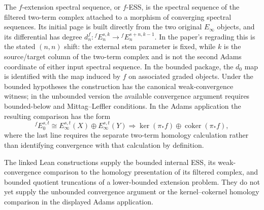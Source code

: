 \begin{definition}
  \label{def:f-extension-ss}
  \notready
  The $f$-extension spectral sequence, or $f$-ESS, is the spectral sequence of
  the filtered two-term complex attached to a morphism of converging spectral
  sequences.  Its initial page is built directly from the two original
  $E_\infty$ objects, and its differential has degree
  $d_n^f:{}^fE_n^{s,k}\to{}^fE_n^{s+n,k-1}$.  In the paper's regrading this is
  the stated $(n,n)$ shift: the external stem parameter is fixed, while $k$
  is the source/target column of the two-term complex and is not the second
  Adams coordinate of either input spectral sequence.  In the bounded
  package, the $d_0$ map is identified with the map induced by $f$ on
  associated graded objects.  Under the bounded hypotheses the construction has the
  canonical weak-convergence witness; in the unbounded version the available
  convergence argument requires bounded-below and Mittag--Leffler conditions.
  In the Adams application the resulting comparison has the form
  \[
    {}^fE_0^{s,t}\cong E_\infty^{s,t}(X)\oplus
      E_\infty^{s,t}(Y)
    \Longrightarrow
    \ker(\pi_*f)\oplus\operatorname{coker}(\pi_*f),
  \]
  where the last line requires the separate two-term homology
  calculation rather than identifying convergence with that calculation by
  definition.

  The linked Lean constructions supply the bounded internal ESS, its
  weak-convergence comparison to the homology presentation of its filtered
  complex, and bounded quotient truncations of a lower-bounded extension
  problem.  They do not yet supply the unbounded convergence argument or the
  kernel--cokernel homology comparison in the displayed Adams application.
\end{definition}

